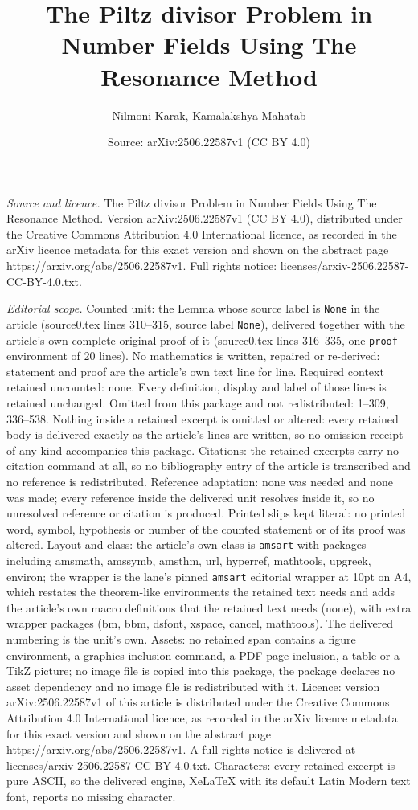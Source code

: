 \documentclass[10pt,a4paper]{amsart}
\title[The Piltz divisor Problem in Number Fields Using The Resonan]{The Piltz divisor Problem in Number Fields Using The Resonance Method}
\author{Nilmoni Karak, Kamalakshya Mahatab}
\date{Source: arXiv:2506.22587v1 (CC BY 4.0)}
\begin{document}
\maketitle

\noindent\emph{Source and licence.} The Piltz divisor Problem in Number Fields Using The Resonance Method. Version arXiv:2506.22587v1 (CC BY 4.0), distributed under the Creative Commons Attribution 4.0 International licence, as recorded in the arXiv licence metadata for this exact version and shown on the abstract page https://arxiv.org/abs/2506.22587v1. Full rights notice: licenses/arxiv-2506.22587-CC-BY-4.0.txt.\par\smallskip

\noindent\textit{Editorial scope.} Counted unit: the Lemma whose source label is \texttt{None} in the article (source0.tex lines 310--315, source label \texttt{None}), delivered together with the article's own complete original proof of it (source0.tex lines 316--335, one \texttt{proof} environment of 20 lines). No mathematics is written, repaired or re-derived: statement and proof are the article's own text line for line. Required context retained uncounted: none. Every definition, display and label of those lines is retained unchanged. Omitted from this package and not redistributed: 1--309, 336--538. Nothing inside a retained excerpt is omitted or altered: every retained body is delivered exactly as the article's lines are written, so no omission receipt of any kind accompanies this package. Citations: the retained excerpts carry no citation command at all, so no bibliography entry of the article is transcribed and no reference is redistributed. Reference adaptation: none was needed and none was made; every reference inside the delivered unit resolves inside it, so no unresolved reference or citation is produced. Printed slips kept literal: no printed word, symbol, hypothesis or number of the counted statement or of its proof was altered. Layout and class: the article's own class is \texttt{amsart} with packages including amsmath, amssymb, amsthm, url, hyperref, mathtools, upgreek, environ; the wrapper is the lane's pinned \texttt{amsart} editorial wrapper at 10pt on A4, which restates the theorem-like environments the retained text needs and adds the article's own macro definitions that the retained text needs (none), with extra wrapper packages (bm, bbm, dsfont, xspace, cancel, mathtools). The delivered numbering is the unit's own. Assets: no retained span contains a figure environment, a graphics-inclusion command, a PDF-page inclusion, a table or a TikZ picture; no image file is copied into this package, the package declares no asset dependency and no image file is redistributed with it. Licence: version arXiv:2506.22587v1 of this article is distributed under the Creative Commons Attribution 4.0 International licence, as recorded in the arXiv licence metadata for this exact version and shown on the abstract page https://arxiv.org/abs/2506.22587v1. A full rights notice is delivered at licenses/arxiv-2506.22587-CC-BY-4.0.txt. Characters: every retained excerpt is pure ASCII, so the delivered engine, XeLaTeX with its default Latin Modern text font, reports no missing character.
\end{document}
